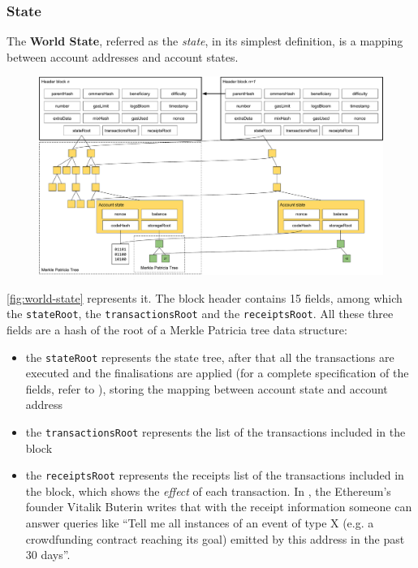 \subsubsection{State}
\label{sec:world-state}

The \textbf{World State}, referred as the \emph{state}, in its simplest
definition, is a mapping between account addresses and account states.

\begin{figure}[h]
  \centering
  \includegraphics[width=\textwidth]{./res/img/world-state.pdf}
\label{fig:world-state}
\end{figure}

\autoref{fig:world-state} represents it. The block header contains 15 fields,
among which the \verb+stateRoot+, the \verb+transactionsRoot+ and the
\verb+receiptsRoot+. All these three fields are a hash of the root of a Merkle
Patricia tree data structure:

\begin{itemize}
  \item the \verb+stateRoot+ represents the state tree, after that all the
  transactions are executed and the finalisations are applied (for a complete
  specification of the fields, refer to \cite{wood2018ethereum}), storing the
  mapping between account state and account address
  \item the \verb+transactionsRoot+ represents the list of the transactions
  included in the block
  \item the \verb+receiptsRoot+ represents the receipts list of the transactions
  included in the block, which shows the \emph{effect} of each transaction. In
  \cite{merklingethereum}, the Ethereum's founder Vitalik Buterin writes that
  with the receipt information someone can answer queries like ``Tell me all
  instances of an event of type X (e.g. a crowdfunding contract reaching its
  goal) emitted by this address in the past 30 days''.
\end{itemize}

